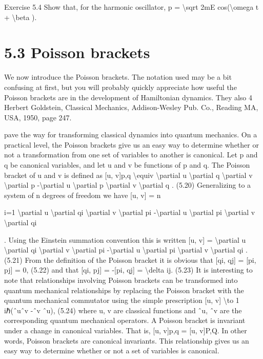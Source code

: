 \begin{exercise}
Exercise 5.4 Show
that,
for
the
harmonic
oscillator,
p =
\textbackslash{}sqrt
2mE
cos(\textbackslash{}omega t + \textbackslash{}beta ).
\end{exercise}

\section*{5.3  Poisson brackets}

We now introduce the Poisson brackets. The notation used may be a bit
confusing at first, but you will probably quickly appreciate how useful the
Poisson brackets are in the development of Hamiltonian dynamics. They also
4 Herbert Goldstein, Classical Mechanics, Addison-Wesley Pub. Co., Reading MA, USA, 1950,
page 247.

pave the way for transforming classical dynamics into quantum mechanics.
On a practical level, the Poisson brackets give us an easy way to determine
whether or not a transformation from one set of variables to another is
canonical.
Let p and q be canonical variables, and let u and v be functions of p and q.
The Poisson bracket of u and v is defined as
[u, v]p,q \textbackslash{}equiv \textbackslash{}partial u
\textbackslash{}partial q
\textbackslash{}partial v
\textbackslash{}partial p -\textbackslash{}partial u
\textbackslash{}partial p
\textbackslash{}partial v
\textbackslash{}partial q .
(5.20)
Generalizing to a system of n degrees of freedom we have
[u, v] =
n

i=1
\textbackslash{}partial u
\textbackslash{}partial qi
\textbackslash{}partial v
\textbackslash{}partial pi
-\textbackslash{}partial u
\textbackslash{}partial pi
\textbackslash{}partial v
\textbackslash{}partial qi

.
Using the Einstein summation convention this is written
[u, v] = \textbackslash{}partial u
\textbackslash{}partial qi
\textbackslash{}partial v
\textbackslash{}partial pi
-\textbackslash{}partial u
\textbackslash{}partial pi
\textbackslash{}partial v
\textbackslash{}partial qi
.
(5.21)
From the definition of the Poisson bracket it is obvious that
[qi, qj] = [pi, pj] = 0,
(5.22)
and that
[qi, pj] = -[pi, qj] = \textbackslash{}delta ij.
(5.23)
It is interesting to note that relationships involving Poisson brackets can
be transformed into quantum mechanical relationships by replacing the
Poisson bracket with the quantum mechanical commutator using the simple
prescription
[u, v] \textbackslash{}to 1
iℏ(ˆuˆv -ˆv ˆu),
(5.24)
where u, v are classical functions and ˆu, ˆv are the corresponding quantum
mechanical operators.
A Poisson bracket is invariant under a change in canonical variables.
That is,
[u, v]p,q = [u, v]P,Q.
In other words, Poisson brackets are canonical invariants. This relationship
gives us an easy way to determine whether or not a set of variables is canonical.

